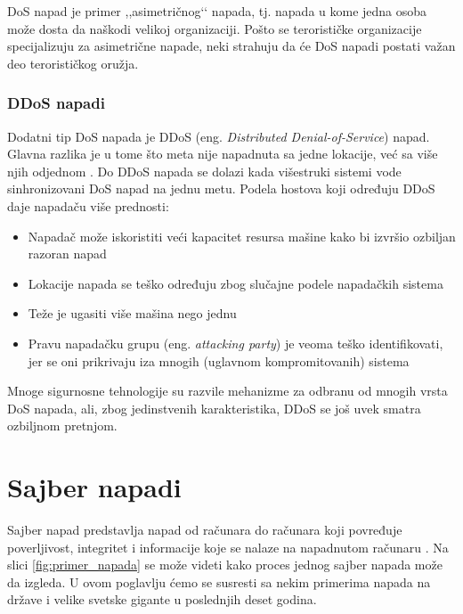 \documentclass[a4paper]{article}
\theoremstyle{break}
\begin{document}
{DoS napad je primer ,,asimetričnog‘‘ napada, tj. napada u kome jedna osoba može dosta da naškodi velikoj organizaciji. Pošto se terorističke organizacije specijalizuju za asimetrične napade, neki strahuju da će DoS napadi postati važan deo terorističkog oružja.

\subsubsection{DDoS napadi}
\label{subsubsec:DDoS}

Dodatni tip DoS napada je DDoS (eng. {\em Distributed Denial-of-Service}) napad. Glavna razlika je u tome što meta nije napadnuta sa jedne lokacije, već sa više njih odjednom \cite{ddos}. Do DDoS napada se dolazi kada višestruki sistemi vode sinhronizovani DoS napad na jednu metu. Podela hostova koji određuju DDoS daje napadaču više prednosti:
\begin{itemize}
\item Napadač može iskoristiti veći kapacitet resursa mašine kako bi izvršio ozbiljan razoran napad
\item Lokacije napada se teško određuju zbog slučajne podele napadačkih sistema
\item Teže je ugasiti više mašina nego jednu
\item Pravu napadačku grupu (eng. {\em attacking party}) je veoma teško identifikovati, jer se oni prikrivaju iza mnogih (uglavnom kompromitovanih) sistema
\end{itemize}

Mnoge sigurnosne tehnologije su razvile mehanizme za odbranu od mnogih vrsta DoS napada, ali, zbog jedinstvenih karakteristika, DDoS se još uvek smatra ozbiljnom pretnjom.\\

\section{Sajber napadi}
\label{sec:sajber_napadi}

Sajber napad predstavlja napad od računara do računara koji povređuje poverljivost, integritet i informacije koje se nalaze na napadnutom računaru \cite{knjiga}. Na slici \ref{fig:primer_napada} se može videti kako proces jednog sajber napada može da izgleda. U ovom poglavlju ćemo se susresti sa nekim primerima napada na države i velike svetske gigante u poslednjih deset godina.


}
\end{document}
